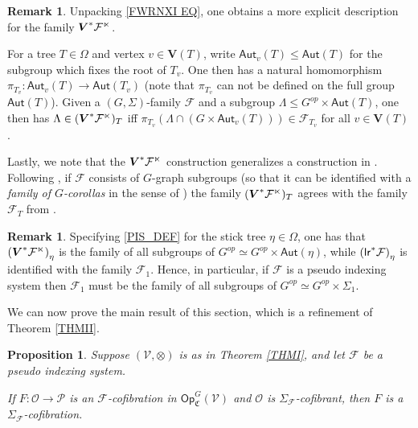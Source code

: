 \documentclass[a4paper,10pt
,draft
]{article}%
\numberwithin{equation}{section}
\numberwithin{figure}{section}
\newtheorem{proposition}[equation]{Proposition}%
\theoremstyle{definition} %
\newtheorem{remark}[equation]{Remark}%
\newcommand{\Op}{\mathsf{Op}}%
\newcommand{\F}{\ensuremath{\mathcal F}}
\newcommand{\V}{\ensuremath{\mathcal V}}
\renewcommand{\O}{\ensuremath{\mathcal O}}
\renewcommand{\P}{\ensuremath{\mathcal P}}
\newcommand{\1}{\ensuremath{\mathbbm 1}}%
\begin{document}
\begin{remark}
	Unpacking \eqref{FWRNXI EQ}, one obtains a more 
	explicit description for the family
	$\boldsymbol{V}^{\**}\F^\ltimes$.
	
	For a tree $T \in \Omega$
	and vertex $v \in \boldsymbol{V}(T)$, write 
	$\mathsf{Aut}_{v}(T) \leq \mathsf{Aut}(T)$ for the subgroup which fixes the root of $T_v$.
	One then has a natural homomorphism
	$\pi_{T_v} \colon \mathsf{Aut}_v(T) \to \mathsf{Aut}(T_v)$
	(note that $\pi_{T_v}$ can not be defined on the full group
	$\mathsf{Aut}(T)$).
	Given a $(G,\Sigma)$-family $\F$ and a subgroup $\Lambda \leq G^{op} \times \mathsf{Aut}(T)$,
	one then has
	$\Lambda \in (\boldsymbol{V}^{\**}\F^\ltimes)_T$ iff
	$\pi_{T_v}\left( \Lambda \cap (G \times \mathsf{Aut}_{v}(T)) \right) \in \F_{T_v}$
	for all $v \in \boldsymbol{V}(T)$.
	
	Lastly, we note that the $\boldsymbol{V}^{\**}\F^\ltimes$
	construction generalizes a construction in
	\cite{BP_geo}.
	Following \cite[Rem. 6.48]{BP_geo}, 
	if $\F$ consists of $G$-graph subgroups
	(so that it can be identified with a 
	\textit{family of $G$-corollas} in the sense of \cite[Def. 4.53]{BP_geo})
	the family $(\boldsymbol{V}^{\**}\F^\ltimes)_T$ agrees
	with the family $\F_T$ from \cite[Prop. 6.46]{BP_geo}.
\end{remark}


\begin{remark}\label{PSEUSTI REM}
	Specifying \eqref{PIS_DEF}
	for the stick tree $\eta \in \Omega$,
	one has that 
	$
	\left(\boldsymbol{V}^{\**} \mathcal{F}^{\ltimes}\right)_{\eta}
	$
	is the family of all subgroups of
	$G^{op} \simeq G^{op} \times \mathsf{\mathsf{Aut}}(\eta)$,
	while
	$
	\left(\mathsf{lr}^{\**} \mathcal{F}\right)_{\eta}
	$
	is identified with the family 
	$\F_1$.
	Hence, in particular, if $\F$ is a pseudo indexing system then
	$\F_1$ must be the family of all subgroups of
	$G^{op} \simeq G^{op} \times \Sigma_1$.
\end{remark}



We can now prove the main result of this section, which is a refinement of Theorem
\ref{THMII}.



\begin{proposition}\label{SIGMAG_COF PROP}
	Suppose $(\V, \otimes)$ is as in Theorem \ref{THMI},
	and let $\F$ be a pseudo indexing system.
	
	If $F \colon \O \to \P$ is an $\F$-cofibration in $\Op^G_{\mathfrak C}(\V)$ and $\O$ is $\Sigma_\F$-cofibrant,
	then $F$ is a $\Sigma_\F$-cofibration.
\end{proposition}
\end{document}
